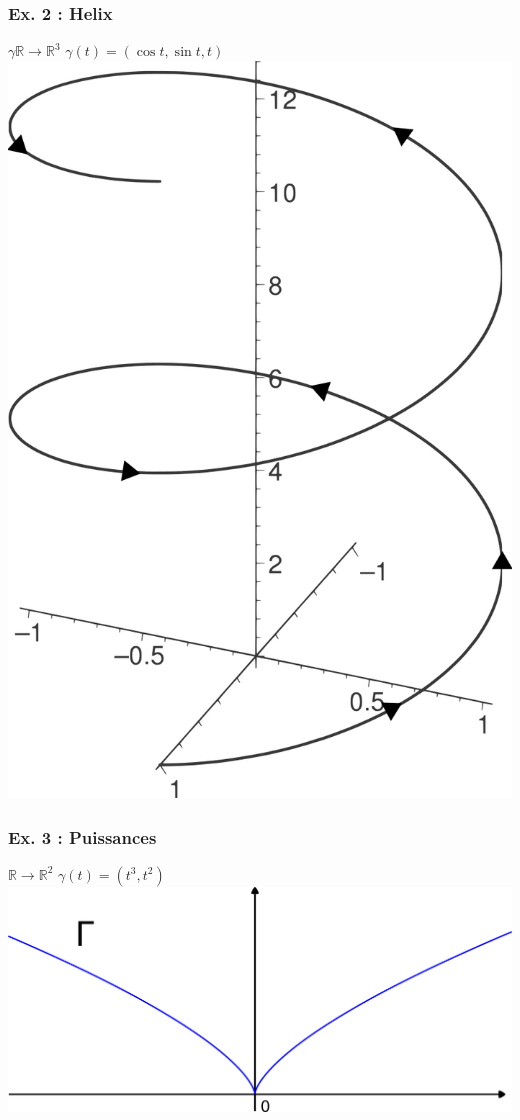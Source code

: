 \documentclass[11pt]{article}
\begin{document}
\subsubsection{Ex. 2 : Helix}
\label{sec:orgheadline11}
\(\gamma \mathbb{R} \rightarrow \mathbb{R}^3\) \(\gamma(t) = (\cos t, \sin t,t)\)
\includegraphics[width=.9\linewidth]{images/an_ch2_ex_2.png}
\subsubsection{Ex. 3 : Puissances}
\label{sec:orgheadline12}
\(\mathbb{R} \rightarrow \mathbb{R}^2\) \(\gamma(t) = (t^3,t^2)\)
\includegraphics[width=.9\linewidth]{images/an_ch2_ex_3.png} 
\end{document}

